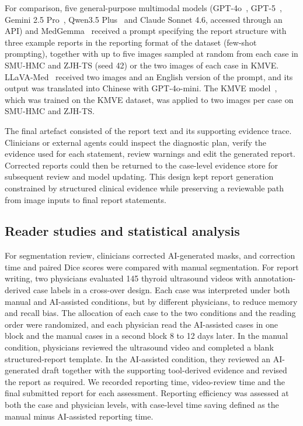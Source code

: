 \documentclass[fleqn,10pt]{wlscirep}
\begin{document}
For comparison, five general-purpose multimodal models (GPT-4o~\cite{openai_gpt4_2024}, GPT-5~\cite{openai2025gpt5systemcard}, Gemini 2.5 Pro~\cite{comanici_gemini_2025}, Qwen3.5 Plus~\cite{yang_qwen3_2025} and Claude Sonnet 4.6, accessed through an API) and MedGemma~\cite{sellergren2025medgemma} received a prompt specifying the report structure with three example reports in the reporting format of the dataset (few-shot prompting), together with up to five images sampled at random from each case in SMU-HMC and ZJH-TS (seed 42) or the two images of each case in KMVE. LLaVA-Med~\cite{li_llavamed_2023} received two images and an English version of the prompt, and its output was translated into Chinese with GPT-4o-mini. The KMVE model~\cite{li_ultrasound_2024}, which was trained on the KMVE dataset, was applied to two images per case on SMU-HMC and ZJH-TS.

The final artefact consisted of the report text and its supporting evidence trace. Clinicians or external agents could inspect the diagnostic plan, verify the evidence used for each statement, review warnings and edit the generated report. Corrected reports could then be returned to the case-level evidence store for subsequent review and model updating. This design kept report generation constrained by structured clinical evidence while preserving a reviewable path from image inputs to final report statements.


\subsection{Reader studies and statistical analysis}
For segmentation review, clinicians corrected AI-generated masks, and correction time and paired Dice scores were compared with manual segmentation. For report writing, two physicians evaluated 145 thyroid ultrasound videos with annotation-derived case labels in a cross-over design. Each case was interpreted under both manual and AI-assisted conditions, but by different physicians, to reduce memory and recall bias. The allocation of each case to the two conditions and the reading order were randomized, and each physician read the AI-assisted cases in one block and the manual cases in a second block 8 to 12 days later. In the manual condition, physicians reviewed the ultrasound video and completed a blank structured-report template. In the AI-assisted condition, they reviewed an AI-generated draft together with the supporting tool-derived evidence and revised the report as required. We recorded reporting time, video-review time and the final submitted report for each assessment. Reporting efficiency was assessed at both the case and physician levels, with case-level time saving defined as the manual minus AI-assisted reporting time.
\end{document}
